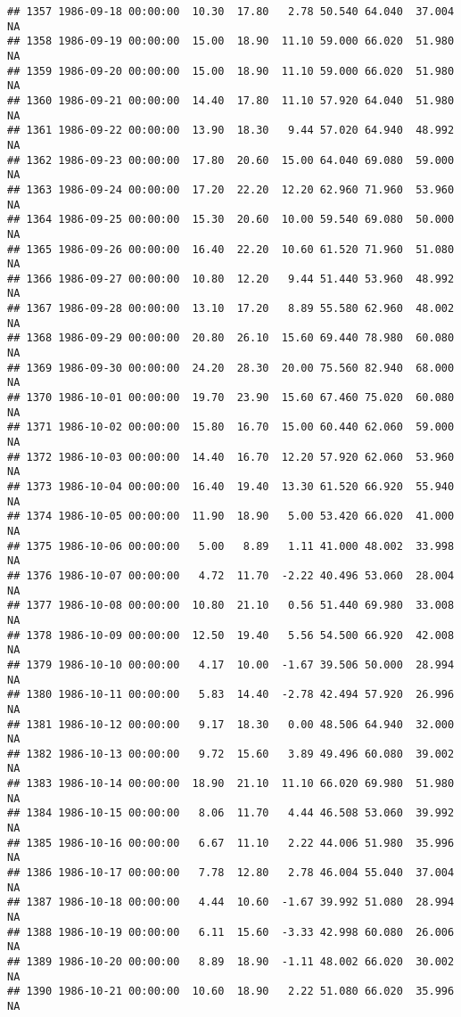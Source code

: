 \documentclass{article}\usepackage{graphicx, color}
\makeatletter
\newenvironment{kframe}{%
 \def\at@end@of@kframe{}%
 \ifinner\ifhmode%
  \def\at@end@of@kframe{\end{minipage}}%
  \begin{minipage}{\columnwidth}%
 \fi\fi%
 \def\FrameCommand##1{\hskip\@totalleftmargin \hskip-\fboxsep
 \colorbox{shadecolor}{##1}\hskip-\fboxsep
     \hskip-\linewidth \hskip-\@totalleftmargin \hskip\columnwidth}%
 \MakeFramed {\advance\hsize-\width
   \@totalleftmargin\z@ \linewidth\hsize
   \@setminipage}}%
 {\par\unskip\endMakeFramed%
 \at@end@of@kframe}
\newenvironment{knitrout}{}{} %
\makeatother
\begin{document}
\begin{knitrout}
\begin{kframe}
\begin{verbatim}
## 1357 1986-09-18 00:00:00  10.30  17.80   2.78 50.540 64.040  37.004     NA
## 1358 1986-09-19 00:00:00  15.00  18.90  11.10 59.000 66.020  51.980     NA
## 1359 1986-09-20 00:00:00  15.00  18.90  11.10 59.000 66.020  51.980     NA
## 1360 1986-09-21 00:00:00  14.40  17.80  11.10 57.920 64.040  51.980     NA
## 1361 1986-09-22 00:00:00  13.90  18.30   9.44 57.020 64.940  48.992     NA
## 1362 1986-09-23 00:00:00  17.80  20.60  15.00 64.040 69.080  59.000     NA
## 1363 1986-09-24 00:00:00  17.20  22.20  12.20 62.960 71.960  53.960     NA
## 1364 1986-09-25 00:00:00  15.30  20.60  10.00 59.540 69.080  50.000     NA
## 1365 1986-09-26 00:00:00  16.40  22.20  10.60 61.520 71.960  51.080     NA
## 1366 1986-09-27 00:00:00  10.80  12.20   9.44 51.440 53.960  48.992     NA
## 1367 1986-09-28 00:00:00  13.10  17.20   8.89 55.580 62.960  48.002     NA
## 1368 1986-09-29 00:00:00  20.80  26.10  15.60 69.440 78.980  60.080     NA
## 1369 1986-09-30 00:00:00  24.20  28.30  20.00 75.560 82.940  68.000     NA
## 1370 1986-10-01 00:00:00  19.70  23.90  15.60 67.460 75.020  60.080     NA
## 1371 1986-10-02 00:00:00  15.80  16.70  15.00 60.440 62.060  59.000     NA
## 1372 1986-10-03 00:00:00  14.40  16.70  12.20 57.920 62.060  53.960     NA
## 1373 1986-10-04 00:00:00  16.40  19.40  13.30 61.520 66.920  55.940     NA
## 1374 1986-10-05 00:00:00  11.90  18.90   5.00 53.420 66.020  41.000     NA
## 1375 1986-10-06 00:00:00   5.00   8.89   1.11 41.000 48.002  33.998     NA
## 1376 1986-10-07 00:00:00   4.72  11.70  -2.22 40.496 53.060  28.004     NA
## 1377 1986-10-08 00:00:00  10.80  21.10   0.56 51.440 69.980  33.008     NA
## 1378 1986-10-09 00:00:00  12.50  19.40   5.56 54.500 66.920  42.008     NA
## 1379 1986-10-10 00:00:00   4.17  10.00  -1.67 39.506 50.000  28.994     NA
## 1380 1986-10-11 00:00:00   5.83  14.40  -2.78 42.494 57.920  26.996     NA
## 1381 1986-10-12 00:00:00   9.17  18.30   0.00 48.506 64.940  32.000     NA
## 1382 1986-10-13 00:00:00   9.72  15.60   3.89 49.496 60.080  39.002     NA
## 1383 1986-10-14 00:00:00  18.90  21.10  11.10 66.020 69.980  51.980     NA
## 1384 1986-10-15 00:00:00   8.06  11.70   4.44 46.508 53.060  39.992     NA
## 1385 1986-10-16 00:00:00   6.67  11.10   2.22 44.006 51.980  35.996     NA
## 1386 1986-10-17 00:00:00   7.78  12.80   2.78 46.004 55.040  37.004     NA
## 1387 1986-10-18 00:00:00   4.44  10.60  -1.67 39.992 51.080  28.994     NA
## 1388 1986-10-19 00:00:00   6.11  15.60  -3.33 42.998 60.080  26.006     NA
## 1389 1986-10-20 00:00:00   8.89  18.90  -1.11 48.002 66.020  30.002     NA
## 1390 1986-10-21 00:00:00  10.60  18.90   2.22 51.080 66.020  35.996     NA

\end{verbatim}
\end{kframe}
\end{knitrout}
\end{document}
